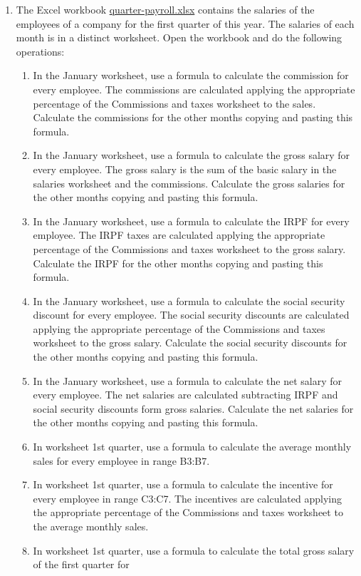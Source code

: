 \begin{enumerate}[leftmargin=*,resume]
\item \label{ex-quarter-payroll}The Excel workbook
\href{http://aprendeconalf.es/office/excel/exercises/formulas/quarter-payroll.xlsx}{\textsf{quarter-payroll.xlsx}}
contains the salaries of the employees of a company for the first quarter of this year.
The salaries of each month is in a distinct worksheet. 
Open the workbook and do the following operations:
\begin{enumerate}
\item In the January worksheet, use a formula to calculate the commission for every employee. 
The commissions are calculated applying the appropriate percentage of the Commissions and taxes worksheet to the sales. 
Calculate the commissions for the other months copying and pasting this formula. 
\item In the January worksheet, use a formula to calculate the gross salary for every employee. 
The gross salary is the sum of the basic salary in the salaries worksheet and the commissions. 
Calculate the gross salaries for the other months copying and pasting this formula. 
\item In the January worksheet, use a formula to calculate the IRPF for every employee. 
The IRPF taxes are calculated applying the appropriate percentage of the Commissions and taxes worksheet to the gross
salary.
Calculate the IRPF for the other months copying and pasting this formula. 
\item In the January worksheet, use a formula to calculate the social security discount for every employee. 
The social security discounts are calculated applying the appropriate percentage of the Commissions and taxes worksheet
to the gross salary.
Calculate the social security discounts for the other months copying and pasting this formula. 
\item In the January worksheet, use a formula to calculate the net salary for every employee. 
The net salaries are calculated subtracting IRPF and social security discounts form gross salaries.
Calculate the net salaries for the other months copying and pasting this formula.
\item In worksheet 1st quarter, use a formula to calculate the average monthly sales for every employee in range
B3:B7.
\item In worksheet 1st quarter, use a formula to calculate the incentive for every employee in range C3:C7.
The incentives are calculated applying the appropriate percentage of the Commissions and taxes worksheet
to the average monthly sales. 
\item In worksheet 1st quarter, use a formula to calculate the total gross salary of the first quarter for

\end{enumerate}
\end{enumerate}

